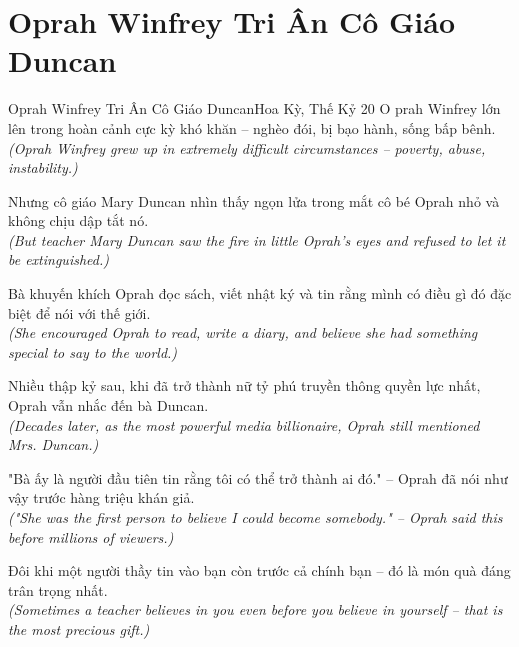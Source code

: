 \section{Oprah Winfrey Tri Ân Cô Giáo Duncan}
\begin{truyen}{Oprah Winfrey Tri Ân Cô Giáo Duncan}{Hoa Kỳ, Thế Kỷ 20}
O prah Winfrey lớn lên trong hoàn cảnh cực kỳ khó khăn -- nghèo đói, bị bạo hành, sống bấp bênh.\\
\textit{(Oprah Winfrey grew up in extremely difficult circumstances -- poverty, abuse, instability.)}

Nhưng cô giáo Mary Duncan nhìn thấy ngọn lửa trong mắt cô bé Oprah nhỏ và không chịu dập tắt nó.\\
\textit{(But teacher Mary Duncan saw the fire in little Oprah's eyes and refused to let it be extinguished.)}

Bà khuyến khích Oprah đọc sách, viết nhật ký và tin rằng mình có điều gì đó đặc biệt để nói với thế giới.\\
\textit{(She encouraged Oprah to read, write a diary, and believe she had something special to say to the world.)}

Nhiều thập kỷ sau, khi đã trở thành nữ tỷ phú truyền thông quyền lực nhất, Oprah vẫn nhắc đến bà Duncan.\\
\textit{(Decades later, as the most powerful media billionaire, Oprah still mentioned Mrs. Duncan.)}

"Bà ấy là người đầu tiên tin rằng tôi có thể trở thành ai đó." -- Oprah đã nói như vậy trước hàng triệu khán giả.\\
\textit{("She was the first person to believe I could become somebody." -- Oprah said this before millions of viewers.)}

\end{truyen}
\begin{baihoc}
  Đôi khi một người thầy tin vào bạn còn trước cả chính bạn -- đó là món quà đáng trân trọng nhất.\\
  \textit{(Sometimes a teacher believes in you even before you believe in yourself -- that is the most precious gift.)}
\end{baihoc}

